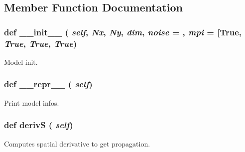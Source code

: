 \subsection{Member Function Documentation}
\hypertarget{classcell__mdl2_1_1_tissue_model_ac775ee34451fdfa742b318538164070e}{
\subsubsection[{\_\-\_\-init\_\-\_\-}]{\setlength{\rightskip}{0pt plus 5cm}def \_\-\_\-init\_\-\_\- ( {\em self}, \/   {\em Nx}, \/   {\em Ny}, \/   {\em dim}, \/   {\em noise} = {}, \/   {\em mpi} = {\ttfamily \mbox{[}True}, \/   {\em True}, \/   {\em True}, \/   {\em True})}}
\label{classcell__mdl2_1_1_tissue_model_ac775ee34451fdfa742b318538164070e}
\begin{DoxyVerb}Model init.\end{DoxyVerb}
 \hypertarget{classcell__mdl2_1_1_tissue_model_ad8b9328939df072e4740cd9a63189744}{
\subsubsection[{\_\-\_\-repr\_\-\_\-}]{\setlength{\rightskip}{0pt plus 5cm}def \_\-\_\-repr\_\-\_\- ( {\em self})}}
\label{classcell__mdl2_1_1_tissue_model_ad8b9328939df072e4740cd9a63189744}
\begin{DoxyVerb}Print model infos.\end{DoxyVerb}
 \hypertarget{classcell__mdl2_1_1_tissue_model_a46f207ec6b3ff2a23c49b540aff0888e}{
\subsubsection[{derivS}]{\setlength{\rightskip}{0pt plus 5cm}def derivS ( {\em self})}}
\label{classcell__mdl2_1_1_tissue_model_a46f207ec6b3ff2a23c49b540aff0888e}
\begin{DoxyVerb}Computes spatial derivative to get propagation.\end{DoxyVerb}
